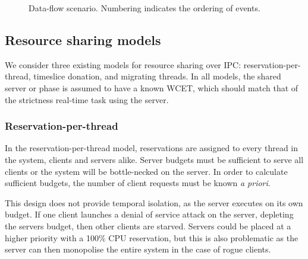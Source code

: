 \begin{figure}
      \centering
      \caption{Data-flow scenario. Numbering indicates the ordering of events.}
      \label{fig:dataflow}
\end{figure}

\subsection{Resource sharing models}

We consider three existing models for resource sharing over IPC: reservation-per-thread, timeslice donation, and migrating threads.
In all models, the shared server or phase is assumed to have a known \gls{WCET}, which should match that of the strictness real-time task using the server.

\subsubsection{Reservation-per-thread}
\label{sec:reservation-per-thread}

In the reservation-per-thread model, reservations are assigned to every thread in the system, clients and servers alike.
Server budgets must be sufficient to serve all clients or the system will be bottle-necked on the server.
In order to calculate sufficient budgets, the number of client requests must be known \emph{a priori}.

This design does not provide temporal isolation, as the server executes on its own budget.
If one client launches a denial of service attack on the server, depleting the servers budget, then other clients are starved.
Servers could be placed at a higher priority with a 100\% CPU reservation, but this is also problematic as the server can then monopolise the entire system in the case of rogue clients.

